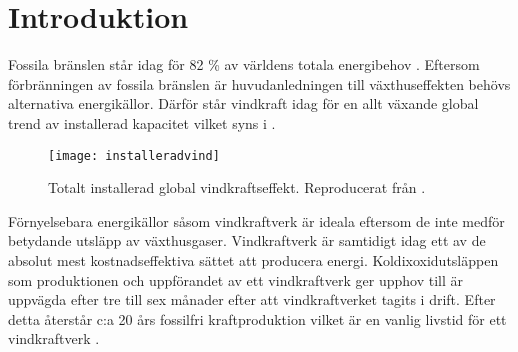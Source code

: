 \chapter{Introduktion} \label{Chapter:Introduction}

Fossila bränslen står idag för 82 \% av världens totala energibehov \citep{Fossila}. Eftersom förbränningen av fossila bränslen är huvudanledningen till växthuseffekten behövs alternativa energikällor. Därför står vindkraft idag för en allt växande global trend av installerad kapacitet vilket syns i .

\begin{figure}[!htb]
  \centering
  \texttt{[image: installeradvind]}
  \caption{Totalt installerad global vindkraftseffekt. Reproducerat från \citet{ackvind}.}
  \label{installerad vindkraft}
\end{figure}

Förnyelsebara energikällor såsom vindkraftverk är ideala eftersom de inte medför betydande utsläpp av växthusgaser. Vindkraftverk är samtidigt idag ett av de absolut mest kostnadseffektiva sättet att producera energi. Koldixoxidutsläppen som produktionen och uppförandet av ett vindkraftverk ger upphov till är uppvägda efter tre till sex månader efter att vindkraftverket tagits i drift. Efter detta återstår c:a 20 års fossilfri kraftproduktion vilket är en vanlig livstid för ett vindkraftverk \citep{GWEC}. 

\begin{comment}
\rework{Dock är vindkraft, likt alla andra kraftkällor - förknippat med sina negativa sidor. Energi kan endast produceras när vinden blåser vilket leder till att energi då måste komma från andra energikällor. När istället det motsatta råder, ett överskott på vindenergi - måste energin lagras eller transporteras vidare till där den behövs. Andra nackdelar är störande ljud som de ger upphov till, skuggor som sveper, elektromagnetisk strålning och fåglar och fladdermöss som dör i kollisioner med rotorbladen. Dessa nackdelars betydelse har med åren minskat eftersom lösningar finns på många av dem, och trots nackdelarna - överväger de positiva effekterna. [Ska nog bort]}
\end{comment}

\begin{comment}
Installerad effekt växer

Tyskland fasar ut efter Fukushima. Till 2020 ingen kärnkraft.

Vindkraftens nackdelar. Endast när det blåser.Oljud. Viosuellt. Skuggor som flimmrar. Djur som dör. Går att göra något åt och problemen minskar succesivt. Positivt överväger det negativa.
\end{comment}


